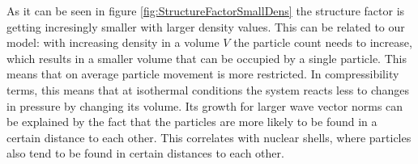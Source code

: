 As it can be seen in figure \ref{fig:StructureFactorSmallDens} the structure factor is getting incresingly smaller with larger density values. This can be related to our model: with increasing density in a volume $V$ the particle count needs to increase, which results in a smaller volume that can be occupied by a single particle. This means that on average particle movement is more restricted. In compressibility terms, this means that at isothermal conditions the system reacts less to changes in pressure by changing its volume. Its growth for larger wave vector norms can be explained by the fact that the particles are more likely to be found in a certain distance to each other. This correlates with nuclear shells, where particles also tend to be found in certain distances to each other.
\begin{figure}[H]
    \centering
    \begin{subfigure}[t]{\textwidth}
        \centering
\end{subfigure}
\end{figure}
